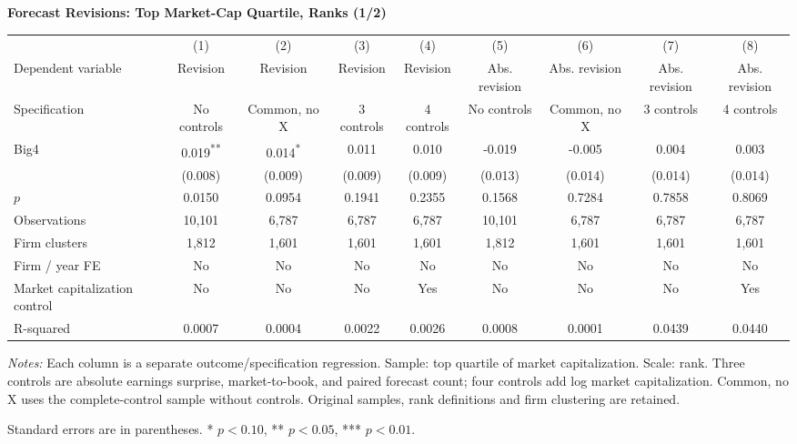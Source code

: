 \documentclass[10pt]{article}
\newcommand{\sym}[1]{\textsuperscript{#1}}
\begin{document}
\begin{minipage}{28.80cm}
\fontsize{10}{12}\selectfont
\setlength{\tabcolsep}{4pt}\renewcommand{\arraystretch}{1.08}
{\large\bfseries Forecast Revisions: Top Market-Cap Quartile, Ranks (1/2)}\par\medskip
\begin{tabular*}{\linewidth}{@{\extracolsep{\fill}}lcccccccc@{}}
\toprule
 & (1) & (2) & (3) & (4) & (5) & (6) & (7) & (8) \\
Dependent variable & Revision & Revision & Revision & Revision & Abs. revision & Abs. revision & Abs. revision & Abs. revision \\
Specification & No controls & Common, no X & 3 controls & 4 controls & No controls & Common, no X & 3 controls & 4 controls \\
\midrule
Big4 & 0.019\sym{**} & 0.014\sym{*} & 0.011 & 0.010 & -0.019 & -0.005 & 0.004 & 0.003 \\
 & (0.008) & (0.009) & (0.009) & (0.009) & (0.013) & (0.014) & (0.014) & (0.014) \\
$p$ & 0.0150 & 0.0954 & 0.1941 & 0.2355 & 0.1568 & 0.7284 & 0.7858 & 0.8069 \\
\midrule
Observations & 10,101 & 6,787 & 6,787 & 6,787 & 10,101 & 6,787 & 6,787 & 6,787 \\
Firm clusters & 1,812 & 1,601 & 1,601 & 1,601 & 1,812 & 1,601 & 1,601 & 1,601 \\
Firm / year FE & No & No & No & No & No & No & No & No \\
Market capitalization control & No & No & No & Yes & No & No & No & Yes \\
R-squared & 0.0007 & 0.0004 & 0.0022 & 0.0026 & 0.0008 & 0.0001 & 0.0439 & 0.0440 \\
\bottomrule\end{tabular*}\par\medskip
\fontsize{9}{11}\selectfont\textit{Notes:} Each column is a separate outcome/specification regression. Sample: top quartile of market capitalization. Scale: rank. Three controls are absolute earnings surprise, market-to-book, and paired forecast count; four controls add log market capitalization. Common, no X uses the complete-control sample without controls. Original samples, rank definitions and firm clustering are retained.
\par Standard errors are in parentheses. * $p<0.10$, ** $p<0.05$, *** $p<0.01$.
\end{minipage}
\end{document}

